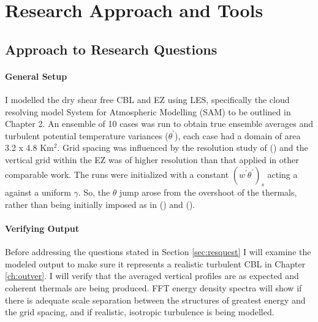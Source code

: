 
\chapter{Research Approach and Tools}

\label{ch:tools}
\setlength{\parindent}{0cm}
\section{Approach to Research Questions}
\label{sec:Approach}
\subsubsection{General Setup}

I modelled the dry shear free \acs{CBL} and \acs{EZ} using \acs{LES}, specifically the cloud resolving model System for Atmospheric Modelling (SAM) to be outlined in Chapter 2.  An ensemble of 10 cases was run to obtain true ensemble averages and turbulent potential temperature variances ($\theta^{'}$), each case had a domain of area 3.2 x 4.8 Km$^{2}$. Grid spacing was influenced by the resolution study of \citeauthor{SullPat} (\citeyear{SullPat}) and the vertical grid within the \acs{EZ} was of higher resolution than that applied in other comparable work.  The runs were initialized with a constant $(\overline{w^{'}\theta^{'}})_{s}$ acting a against a uniform $\gamma$.  So, the  $\theta$ jump arose from the overshoot of the thermals, rather than being initially imposed as in \citeauthor{SullMoengStev} (\citeyear{SullMoengStev}) and \citeauthor{BrooksFowler2} (\citeyear{BrooksFowler2}).\\

\subsubsection{Verifying Output}

Before addressing the questions stated in Section \ref{sec:resquest} I will examine the modeled output to make sure it represents a realistic turbulent \acs{CBL} in Chapter \ref{ch:outver}. I will verify that the averaged vertical profiles are as expected and coherent thermals are being produced.  FFT energy density spectra will show if there is adequate scale separation between the structures of greatest energy and the grid spacing, and if realistic, isotropic turbulence is being modelled.  


